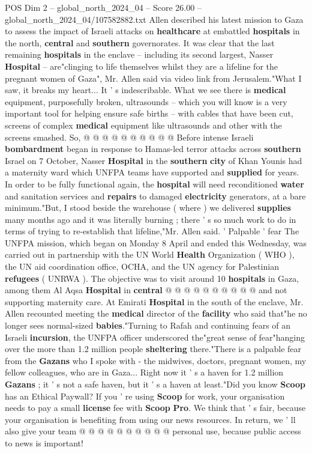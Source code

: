 \begin{textsample}{POS Dim 2 – global\_north\_2024\_04 – Score 26.00 – global\_north\_2024\_04/107582882.txt}
Allen described his latest mission to Gaza to assess the impact of Israeli attacks on \textbf{healthcare} at embattled \textbf{hospitals} in the north, \textbf{central} and \textbf{southern} governorates.
It was clear that the last remaining \textbf{hospitals} in the enclave -- including its second largest, Nasser \textbf{Hospital} -- are"clinging to life themselves whilst they are a lifeline for the pregnant women of Gaza", Mr.
Allen said via video link from Jerusalem."What I saw, it breaks my heart...
It ' s indescribable.
What we see there is \textbf{medical} equipment, purposefully broken, ultrasounds -- which you will know is a very important tool for helping ensure safe births -- with cables that have been cut, screens of complex \textbf{medical} equipment like ultrasounds and other with the screens smashed.
So, @ @ @ @ @ @ @ @ @ @ Before intense Israeli \textbf{bombardment} began in response to Hamas-led terror attacks across \textbf{southern} Israel on 7 October, Nasser \textbf{Hospital} in the \textbf{southern} \textbf{city} of Khan Younis had a maternity ward which UNFPA teams have supported and \textbf{supplied} for years.
In order to be fully functional again, the \textbf{hospital} will need reconditioned \textbf{water} and sanitation services and \textbf{repairs} to damaged \textbf{electricity} generators, at a bare minimum."But, I stood beside the warehouse ( where ) we delivered \textbf{supplies} many months ago and it was literally burning ; there ' s so much work to do in terms of trying to re-establish that lifeline,"Mr.
Allen said. ' Palpable ' fear The UNFPA mission, which began on Monday 8 April and ended this Wednesday, was carried out in partnership with the UN World \textbf{Health} Organization ( WHO ), the UN aid coordination office, OCHA, and the UN agency for Palestinian \textbf{refugees} ( UNRWA ).
The objective was to visit around 10 \textbf{hospitals} in Gaza, among them Al Aqsa \textbf{Hospital} in \textbf{central} @ @ @ @ @ @ @ @ @ @ and not supporting maternity care.
At Emirati \textbf{Hospital} in the south of the enclave, Mr.
Allen recounted meeting the \textbf{medical} director of the \textbf{facility} who said that"he no longer sees normal-sized \textbf{babies}."Turning to Rafah and continuing fears of an Israeli \textbf{incursion}, the UNFPA officer underscored the"great sense of fear"hanging over the more than 1.2 million people \textbf{sheltering} there."There is a palpable fear from the \textbf{Gazans} who I spoke with - the midwives, doctors, pregnant women, my fellow colleagues, who are in Gaza...
Right now it ' s a haven for 1.2 million \textbf{Gazans} ; it ' s not a safe haven, but it ' s a haven at least."Did you know \textbf{Scoop} has an Ethical Paywall?
If you ' re using \textbf{Scoop} for work, your organisation needs to pay a small \textbf{license} fee with \textbf{Scoop} \textbf{Pro}.
We think that ' s fair, because your organisation is benefiting from using our news resources.
In return, we ' ll also give your team @ @ @ @ @ @ @ @ @ @ personal use, because public access to news is important!


\end{textsample}
